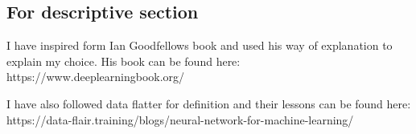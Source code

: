 \documentclass[11pt, a4paper , landscape]{article}
\begin{document}
\subsection{For descriptive section}\label{for-descriptive-section}

I have inspired form Ian Goodfellows book and used his way of
explanation to explain my choice. His book can be found here:
https://www.deeplearningbook.org/

I have also followed data flatter for definition and their lessons can
be found here:
https://data-flair.training/blogs/neural-network-for-machine-learning/


    
    
    
    
\end{document}
